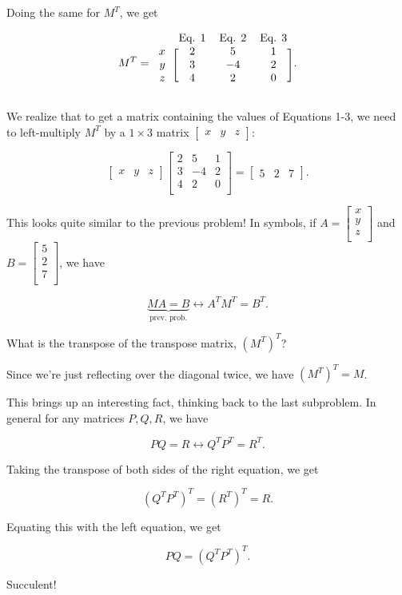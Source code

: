 \documentclass[../key.tex]{subfiles}
\begin{document}
Doing the same for $M^T$, we get

$$M^T=\begin{blockarray}{rccc}
& \text{Eq. 1} & \text{Eq. 2} & \text{Eq. 3} \\
\begin{block}{r[ccc]}
x & 2 & 5 & 1 \\
y & 3 & -4 & 2 \\
z & 4 & 2 & 0 \\
\end{block}
\end{blockarray}.$$

We realize that to get a matrix containing the values of Equations 1-3, we need to left-multiply $M^T$ by a $1\times 3$ matrix $\begin{bmatrix} x & y & z \end{bmatrix}$:

$$\begin{bmatrix} x & y & z \end{bmatrix} \begin{bmatrix}
2 & 5 & 1 \\
3 & -4 & 2 \\
4 & 2 & 0 \\
\end{bmatrix} = \begin{bmatrix}5 & 2 & 7\end{bmatrix}.$$

This looks quite similar to the previous problem! In symbols, if $A = \begin{bmatrix} x \\ y \\ z \\ \end{bmatrix}$ and $B = \begin{bmatrix} 5 \\ 2 \\ 7 \\ \end{bmatrix}$, we have

$$\underbrace{MA=B}_\text{prev. prob.} \longleftrightarrow A^TM^T=B^T.$$

\begin{inner_problem}
\item What is the transpose of the transpose matrix, $(M^T)^T$?
\end{inner_problem}

Since we're just reflecting over the diagonal twice, we have $(M^T)^T=M$.

This brings up an interesting fact, thinking back to the last subproblem. In general for any matrices $P,Q,R$, we have

$$PQ=R \longleftrightarrow Q^TP^T=R^T.$$

Taking the transpose of both sides of the right equation, we get

$$(Q^TP^T)^T=(R^T)^T = R.$$

Equating this with the left equation, we get

$$PQ = (Q^TP^T)^T.$$

Succulent!
\end{document}
